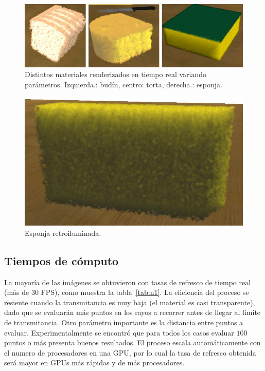 \documentclass[oneside,a4paper,spanish,links]{amca}
\begin{document}
\begin{figure}[htb!]
  \centerline{\includegraphics[scale=0.3]{fig6}}
  \caption{Distintos materiales renderizados en tiempo real variando parámetros. Izquierda.: budín, centro: torta, derecha.: esponja. }
  \label{fg:fig6}
\end{figure}



\begin{figure}[htb!]
  \centerline{\includegraphics[scale=0.25]{fig7}}
  \caption{Esponja retroiluminada.}
  \label{fg:fig7}
\end{figure}


\subsection{Tiempos de cómputo}

La mayoría de las imágenes se obtuvieron con tasas de refresco de
tiempo real (más de 30 FPS), como muestra la tabla~\ref{tab:n1}. La
eficiencia del proceso se resiente cuando la transmitancia es muy
baja (el material es casi transparente), dado que se evaluarán más
puntos en los rayos a recorrer antes de llegar al límite de
transmitancia. Otro parámetro importante es la distancia entre puntos
a evaluar. Experimentalmente se encontró que para todos los casos
evaluar $100$ puntos o más presenta buenos resultados. El proceso escala
automáticamente con el numero de procesadores en una GPU, por lo cual
la tasa de refresco obtenida será mayor en GPUs más rápidas y de más
procesadores.
\end{document}
